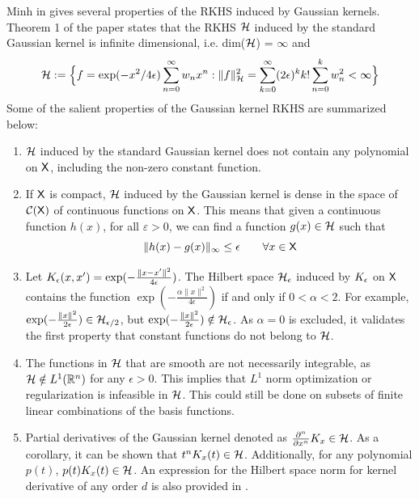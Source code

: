 Minh in \cite{min10} gives several properties of the RKHS induced by Gaussian kernels. Theorem 1 of the paper states that the RKHS ${\cal H}$ induced by the standard Gaussian kernel is infinite dimensional, i.e. dim(${\cal H}$) = $\infty$ and 
\begin{equation}
{\cal H} := \Bigl\{ f = \exp(-x^2/4\epsilon) \sum_{n=0}^\infty w_n x^n: \|f\|^2_{\cal H} = \sum_{k=0}^\infty (2\epsilon)^k k! \sum_{n=0}^k w_n^2 <\infty \Bigr\}
\end{equation}
Some of the salient properties of the Gaussian kernel RKHS are summarized below: 
\begin{enumerate}
	\item ${\cal H}$ induced by the standard Gaussian kernel does not contain any polynomial on ${\sf X}$, including the non-zero constant function. 
	
	\item If ${\sf X}$ is compact, ${\cal H}$ induced by the Gaussian kernel is dense in the space of $\mathcal{C}({\sf X})$ of continuous functions on ${\sf X}$.
	This means that given a continuous function $h(x)$, for all $\varepsilon >0$, we can find a function $g(x) \in {\cal H}$ such that 
	\begin{equation}
	\|h(x) - g(x)\|_\infty \leq \epsilon \qquad \forall x \in {\sf X}
	\end{equation} 
	\item Let $K_{\epsilon}(x,x') = \exp(-\frac{\|x-x'\|^2}{4\epsilon})$. The Hilbert space ${\cal H}_\epsilon$ induced by $K_\epsilon$ on ${\sf X}$ contains the function $\exp(-\frac{\alpha \|x\|^2} {4 \epsilon})$ if and only if $0<\alpha <2$. For example, $\exp(-\frac{\|x\|^2}{2 \epsilon}) \in {\cal H}_{\epsilon/2}$, but  $\exp(-\frac{\|x\|^2}{2 \epsilon}) \notin {\cal H}_{\epsilon}$. As $\alpha=0$ is excluded, it validates the first property that constant functions do not belong to ${\cal H}$.
	
	\item The functions in ${\cal H}$ that are smooth are not necessarily integrable, as ${\cal H} \notin L^1(\mathbb{R}^n)$ for any $\epsilon >0$.  This implies that $L^1$ norm optimization or regularization is infeasible in ${\cal H}$. This could still be done on subsets of finite linear combinations of the basis functions.
	

\item Partial derivatives of the Gaussian kernel denoted as $\frac{\partial^n}{\partial x^n} K_x \in {\cal H}$. As a corollary, it can be shown that $t^n K_x(t)\in{\cal H}$. Additionally, for any polynomial $p(t)$, $p(t) K_x(t) \in {\cal H}$. An expression for the Hilbert space norm for kernel derivative of any order $d$ is also provided in \cite{min10}. 
\end{enumerate}

